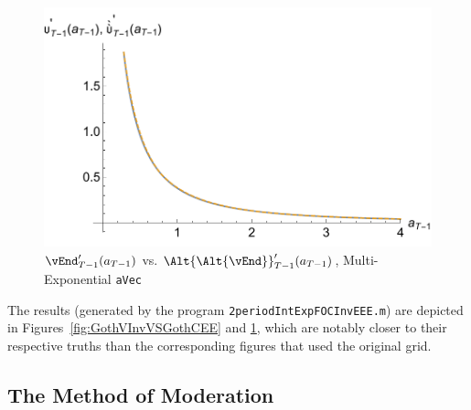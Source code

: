 \documentclass[titlepage]{\econtex}
\begin{document}
\hypertarget{GothVVSGothCInvEEE}{}
\begin{figure}
  \includegraphics{./Figures/GothVVSGothCInvEEE}
  \caption{$\vEnd_{T-1}^{\prime}({a}_{T-1})$ vs.
    $\Alt{\Alt{\vEnd}}_{T-1}^{\prime}({a}_{T-1})$, Multi-Exponential \texttt{aVec}}
  \label{fig:GothVVSGothCInvEE}
\end{figure}

The results (generated by the program \texttt{2periodIntExpFOCInvEEE.m})
are depicted in Figures~\ref{fig:GothVInvVSGothCEE} and
\ref{fig:GothVVSGothCInvEE}, which are notably closer to their
respective truths than the corresponding figures that used the original
grid.

\hypertarget{The-Method-of-Moderation}{}
\subsection{The Method of Moderation}
\end{document}
